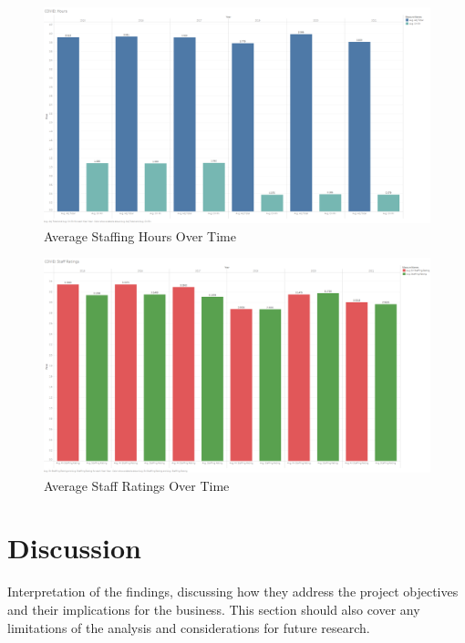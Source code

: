 \documentclass{article}
\theoremstyle{mytheoremstyle}
\theoremstyle{mytheoremstyle}
\theoremstyle{myproblemstyle}
\begin{document}
\begin{figure}[htbp]
\centering
\includegraphics[width=\linewidth]{Images/COVID Hours.png}
\caption{Average Staffing Hours Over Time}
\label{fig:Robust Scaler Results}
\pagebreak
\end{figure}
\begin{figure}[htbp]
\centering
\includegraphics[width=\linewidth]{Images/COVID Staff Ratings.png}
\caption{Average Staff Ratings Over Time}
\label{fig:Robust Scaler Results}
\end{figure}


\pagebreak

\section{Discussion}
Interpretation of the findings, discussing how they address the project objectives and their implications for the business. This section should also cover any limitations of the analysis and considerations for future research.
\end{document}
